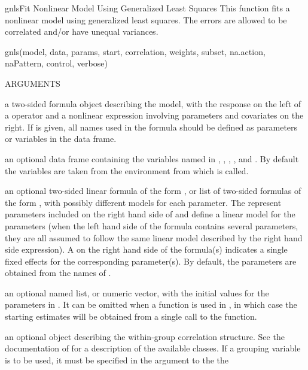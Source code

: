 \documentclass[pdftex]{article} \usepackage{url,graphicx}
\renewcommand{\Twiddle}{\mbox{\(\sim\)}}
\begin{document}
\begin{Helpfile}{gnls}{Fit Nonlinear Model Using Generalized Least Squares}
This function fits a nonlinear model using generalized least
squares. The errors are allowed to be correlated and/or have unequal
variances.
\begin{Example}
gnls(model, data, params, start, correlation, weights, subset,
     na.action, naPattern, control, verbose)
\end{Example}
\begin{Argument}{ARGUMENTS}
\item[\Co{model:}]
a two-sided formula object describing the
model, with the response on the left of a \Co{{\Twiddle}} operator and 
a nonlinear expression involving parameters and covariates on the
right. If  is given, all names used in the formula should
be defined as parameters or variables in the data frame.
\item[\Co{data:}]
an optional data frame containing the variables named in
, , , 
, and . By default the variables are 
taken from the environment from which  is called.
\item[\Co{params:}]
an optional two-sided linear formula of the form
\Co{p1+...+pn{\Twiddle}x1+...+xm}, or list of two-sided formulas of the form
\Co{p1{\Twiddle}x1+...+xm}, with possibly different models for each
parameter. The  represent parameters included on the
right hand side of  and  define a linear
model for the parameters (when the left hand side of the formula
contains several parameters, they are all assumed to follow the same
linear model described by the right hand side expression). A 
on the right hand side of the formula(s) indicates a single fixed
effects for the corresponding parameter(s). By default, the
parameters are obtained from the names of .
\item[\Co{start:}]
an optional named list, or numeric vector, with the
initial values for the parameters in . It can be omitted
when a  function is used in , in which
case the starting estimates will be obtained from a single call to the
 function.
\item[\Co{correlation:}]
an optional  object describing the
within-group correlation structure. See the documentation of
 for a description of the available 
classes. If a grouping variable is to be used, it must be specified
in the  argument to the the 

\end{Argument}
\end{Helpfile}
\end{document}
